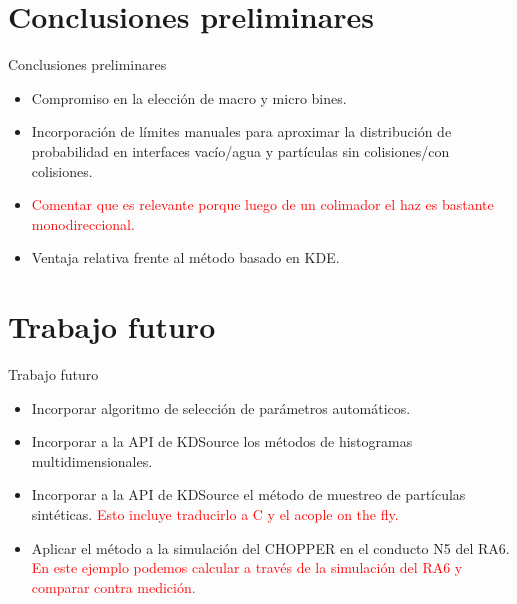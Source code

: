 \documentclass[aspectratio=169,english]{beamer}
\begin{document}
    


\section{Conclusiones preliminares}
\begin{frame}{Conclusiones preliminares}
    \begin{itemize}
        \item Compromiso en la elección de macro y micro bines.\\
        \item Incorporación de límites manuales para aproximar la distribución de probabilidad en interfaces vacío/agua y partículas sin colisiones/con colisiones.\\
        \item \textcolor{red}{Comentar que es relevante porque luego de un colimador el haz es bastante monodireccional.}\\
        \item Ventaja relativa frente al método basado en KDE. \\
    
    \end{itemize}

\end{frame}

\section{Trabajo futuro}
\begin{frame}{Trabajo futuro}

    \begin{itemize}
        \item Incorporar algoritmo de selección de parámetros automáticos.\\
        \item Incorporar a la API de KDSource los métodos de histogramas multidimensionales.\\
        \item Incorporar a la API de KDSource el método de muestreo de partículas sintéticas. \textcolor{red}{Esto incluye traducirlo a C y el acople on the fly.}\\
        \item Aplicar el método a la simulación del CHOPPER en el conducto N5 del RA6. \textcolor{red}{En este ejemplo podemos calcular a través de la simulación del RA6 y comparar contra medición.}\\
    \end{itemize}


\end{frame}
\end{document}
